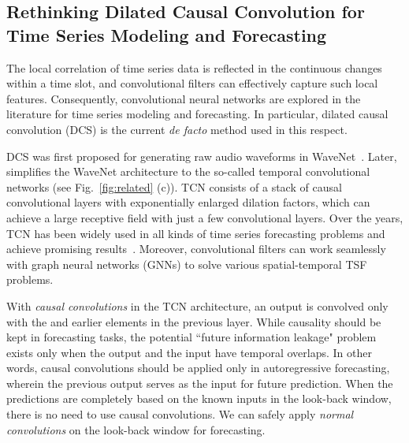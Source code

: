 \documentclass{article}
\begin{document}
\fi


















\subsection{Rethinking Dilated Causal Convolution for Time Series Modeling and Forecasting}
\label{sec:rethinking_tcn}

The local correlation of time series data is reflected in the continuous changes within a time slot, and convolutional filters can effectively capture such local features. Consequently, convolutional neural networks are explored in the literature for time series modeling and forecasting. In particular, dilated causal convolution (DCS) is the current \emph{de facto} method used in this respect. 


DCS was first proposed for generating raw audio waveforms in WaveNet~\citep{Oord2016WaveNetAG}. Later,~\citep{Bai2018AnEE} simplifies the WaveNet architecture to the so-called temporal convolutional networks (see Fig.~\ref{fig:related} (c)). TCN consists of a stack of causal convolutional layers with exponentially enlarged dilation factors, which can achieve a large receptive field with just a few convolutional layers. Over the years, TCN has been widely used in all kinds of time series forecasting problems and achieve promising results~\citep{Wu2019GraphWF,Sen2019ThinkGA}. Moreover, convolutional filters can work seamlessly with graph neural networks (GNNs) to solve various spatial-temporal TSF problems. 

With \emph{causal convolutions} in the TCN architecture, an output  is convolved only with the  and earlier elements in the previous layer. While causality should be kept in forecasting tasks, the potential ``future information leakage" problem exists only when the output and the input have temporal overlaps. In other words, causal convolutions should be applied only in autoregressive forecasting, wherein the previous output serves as the input for future prediction. When the predictions are completely based on the known inputs in the look-back window, there is no need to use causal convolutions. We can safely apply \textit{normal convolutions} on the look-back window for forecasting. 
\end{document}
